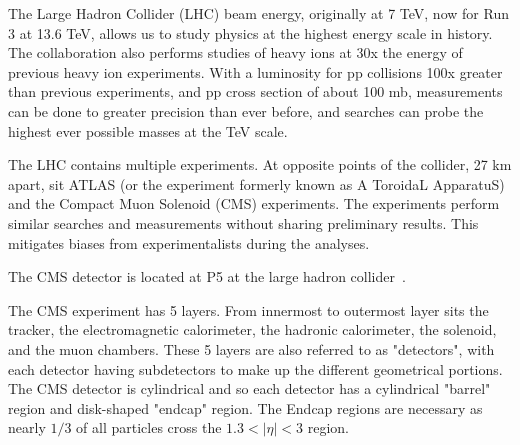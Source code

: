 The Large Hadron Collider (LHC) beam energy, originally at 7 TeV, now for Run 3 at 13.6 TeV, allows us to study physics at the highest energy scale in history. The collaboration also performs studies of heavy ions at 30x the energy of previous heavy ion experiments. With a luminosity for pp collisions 100x greater than previous experiments, and pp cross section of about 100 mb, measurements can be done to greater precision than ever before, and searches can probe the highest ever possible masses at the TeV scale.

The LHC contains multiple experiments. At opposite points of the collider, 27 km apart, sit ATLAS (or the experiment formerly known as A ToroidaL ApparatuS) and the Compact Muon Solenoid (CMS) experiments. The experiments perform similar searches and measurements without sharing preliminary results. This mitigates biases from experimentalists during the analyses.

The CMS detector is located at P5 at the large hadron collider~\cite{CMSExperiment}.


The CMS experiment has 5 layers. From innermost to outermost layer sits the tracker, the electromagnetic calorimeter, the hadronic calorimeter, the solenoid, and the muon chambers. These 5 layers are also referred to as "detectors", with each detector having subdetectors to make up the different geometrical portions. The CMS detector is cylindrical and so each detector has a cylindrical "barrel" region and disk-shaped "endcap" region. The Endcap regions are necessary as nearly $1/3$ of all particles cross the $1.3 < |\eta| < 3$ region.








